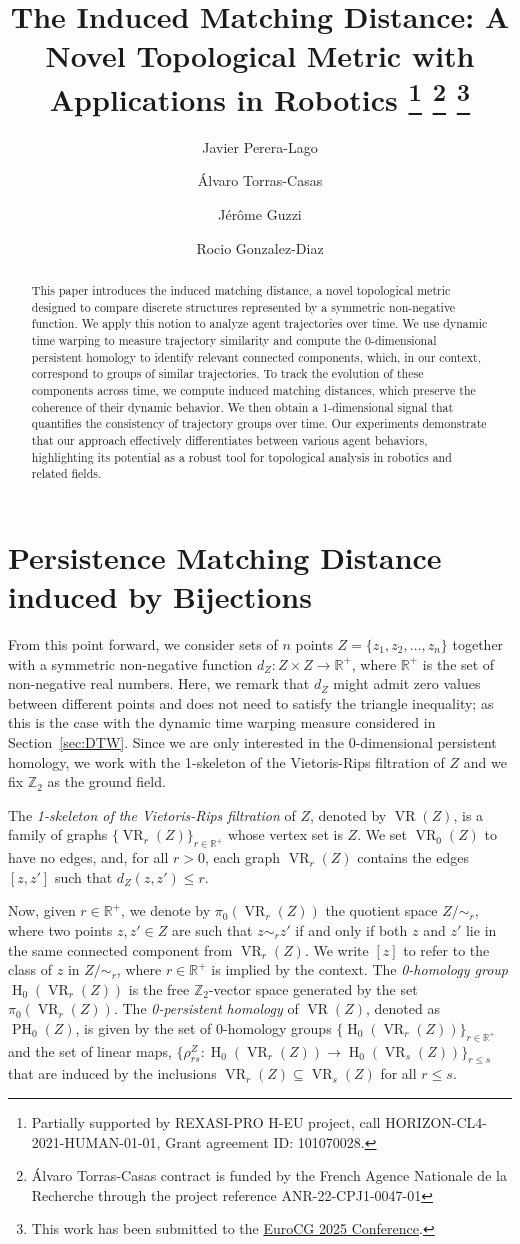 \documentclass{article}
\title{The Induced Matching Distance: A Novel Topological Metric with Applications in Robotics
\footnote{Partially supported by
REXASI-PRO H-EU
project, call HORIZON-CL4-2021-HUMAN-01-01, Grant agreement ID: 101070028.}
\footnote{Álvaro Torras-Casas contract is funded by the French Agence Nationale de la Recherche through the project
reference ANR-22-CPJ1-0047-01}
\footnote{This work has been submitted to the \href{https://kam.mff.cuni.cz/conferences/eurocg2025/}{EuroCG 2025 Conference}.}
}
\author[1]{Javier Perera-Lago}
\author[2]{Álvaro Torras-Casas}
\author[3]{Jérôme Guzzi}
\author[1]{Rocio Gonzalez-Diaz}
\affil[1]{Universidad de Sevilla, Seville, Spain,  \texttt{$\{$jperera,rogodi$\}$@us.es}
}
\affil[2]{Inserm, INRAE, Centre for Research in
 Epidemiology and Statistics (CRESS),
 Université Paris Cité and Université
 Sorbonne Paris Nord
\texttt{alvaro.torras-casas@inserm.fr}
}
\affil[3]{SUPSI, IDSIA, Lugano, Switzerland,
\texttt{jerome.guzzi@idsia.ch }
}
\date{}
\DeclareMathOperator{\PH}{PH}
\DeclareMathOperator{\VR}{VR}
\DeclareMathOperator{\Ho}{H}
\newcommand{\R}{\mathbb{R}^+}
\newcommand{\Z}{\mathbb{Z}}
\newcommand{\scst}{\scriptscriptstyle}
\newcommand{\rhoZ}{\rho^{\scst Z}}
\newcommand{\dZ}{d_{\scst Z}}
\begin{document}
\maketitle

\begin{abstract}
This paper introduces the induced matching distance, 
a novel topological metric designed to compare discrete structures represented by a symmetric non-negative function. We apply this notion to analyze agent trajectories over time. We use dynamic time warping to measure trajectory similarity and compute the 0-dimensional persistent homology to identify relevant connected components, which, in our context, correspond to groups of similar trajectories. To track the evolution of these components across time, we compute induced matching distances, which preserve the coherence of their dynamic behavior. We then obtain a 1-dimensional signal that quantifies the consistency of trajectory groups over time. Our experiments demonstrate that our approach effectively differentiates between various agent behaviors, highlighting its potential as a robust tool for topological analysis in robotics and related fields.
\end{abstract}

\section{Persistence Matching Distance
induced by Bijections}
From this point forward, we consider sets of $n$ points 
 $Z=\{z_1,z_2,\dots,z_n\}$ 
 together with a 
 symmetric non-negative function
 $\dZ\colon Z\times Z\rightarrow \R$,
where  $\R$ is the set of non-negative real numbers.
 Here, we remark that $\dZ$ might admit zero values between different points and does not need to satisfy the triangle inequality; as this is
 the case with the dynamic time warping measure considered in Section~\ref{sec:DTW}.
Since we are only interested in the 0-dimensional persistent homology, we work with the 1-skeleton  of the Vietoris-Rips filtration of $Z$ and we fix 
 $\Z_2$ as the ground field.

 The \emph{1-skeleton  of the Vietoris-Rips filtration} of $Z$,
denoted by $\VR(Z)$, 
is a family of graphs $\{\VR_r(Z)\}_{r\in\R}$ whose vertex set is $Z$. We set $\VR_0(Z)$ to have no edges, and, for all $r>0$, each graph $\VR_r(Z)$ contains the edges $[z,z']$ such that $\dZ(z,z')\leq r$.


Now, given $r\in \R$,
we denote by $\pi_0(\VR_r(Z))$ the quotient space $Z/\sim_r$, where two points $z,z' \in Z$ are such that $z\sim_r z'$ if and only if both $z$ and $z'$ lie in the same connected component from $\VR_r(Z)$.
We write $[z]$ to refer to the class of $z$ in $Z/\sim_r$, where $r \in \R$ is implied by the context.
The \emph{0-homology group}
$\Ho_0(\VR_r(Z))$
is the free $\Z_2$-vector space generated by the set $\pi_0(\VR_r(Z))$. 
%
The \emph{0-persistent homology} of $\VR(Z)$, denoted as $\PH_0(Z)$,
is given by the set 
of 0-homology groups 
$\big\{
\Ho_0(\VR_r(Z))
\big\}_{r\in \R}$ 
and the set of linear maps, 
$
\big\{
\rhoZ_{rs}\colon \Ho_0(\VR_r(Z)) \to\Ho_0(\VR_s(Z))
\big\}_{r\leq s}
$
that are induced by the inclusions
$\VR_r(Z)\subseteq \VR_s(Z)$
for all $r\leq s$.
\end{document}
